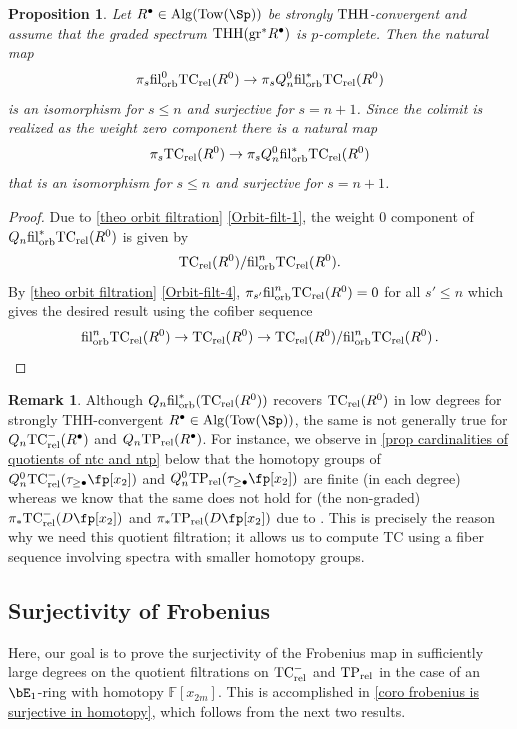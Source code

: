 \documentclass[english,10pt]{amsart}
\newcommand{\rel}{\textup{rel}}
\newcommand{\field}{\mathbb{F}}
\newtheorem{prop}{Proposition}[section]
\theoremstyle{definition}
\newtheorem{rem}{Remark}[section]
\numberwithin{equation}{section}
\DeclareMathOperator{\thh}{\ensuremath{\textup{THH}}}
\newcommand{\THH}{\thh}
\newcommand{\rntc}{\mathrm{TC}_{\rel}^{-}}
\newcommand{\rtp}{\mathrm{TP}_{\rel}}
\newcommand{\rtc}{\mathrm{TC}_{\rel}}
\newcommand{\filorb}{\mathrm{fil}^{*}_{\textup{orb}}}
\newcommand{\filorbo}{\ensuremath{\textup{fil}}^0_{\textup{orb}}}
\newcommand{\filorbn}{\ensuremath{\textup{fil}}^n_{\textup{orb}}}
\newcommand{\Tow}{\mathrm{Tow}}
\newcommand{\Alg}{\mathrm{Alg}}
\newcommand{\pis}{\pi_*}
\newcommand{\gr}{\textup{gr}^*}
\begin{document}
\begin{prop}\label{prop partial filtration aprroximate tc}
Let $R^{\bullet}\in \Alg(\Tow(\Sp))$ be strongly $\THH$-convergent and assume that the graded spectrum $\thh(\gr R^{\bullet})$ is $p$-complete. Then the natural map 
\[\pi_s \filorbo\rtc(R^{0}) \to \pi_s Q_n^0 \filorb \rtc(R^0)
\]
is an isomorphism for $s\leq n$ and surjective for $s=n+1$. Since the colimit is realized as the weight zero component there is a natural map
\[\pi_s \rtc(R^0) \to \pi_s Q_n^0 \filorb \rtc(R^0)
\]
that is an isomorphism for $s\leq n$ and surjective for $s=n+1$.
\end{prop}
\begin{proof}
Due to  \autoref{theo orbit filtration} \eqref{Orbit-filt-1}, the weight $0$ component of $Q_n\filorb \rtc(R^0)$ is given by 
\[\rtc(R^0)/\filorbn\rtc(R^0).\]
By \autoref{theo orbit filtration} \eqref{Orbit-filt-4}, $\pi_{s'} \filorbn\rtc(R^0) = 0$ for all $s'\leq n$ which gives the desired result using the cofiber sequence
\[\filorbn\rtc(R^0) \to \rtc(R^0) \to \rtc(R^0)/\filorbn\rtc(R^0)\,.\] 
\end{proof}

\begin{rem}
Although $Q_n \filorb(\rtc(R^0))$ recovers $\rtc(R^0)$ in low degrees for strongly THH-convergent $R^{\bullet}\in \Alg(\mathrm{Tow}(\Sp))$, the same is not generally true for $Q_n \rntc(R^{\bullet})$ and $Q_n \rtp (R^{\bullet})$. For instance,  we observe in \autoref{prop cardinalities of quotients of ntc and ntp} below that the homotopy groups of $Q_n^0 \rntc(\tau_{\geq \bullet} \fp[x_2])$ and  $Q_n^0 \rtp (\tau_{\geq \bullet} \fp[x_2])$ are finite (in each degree) whereas we know that the same does not hold for (the non-graded) $\pis \rntc (D\fp[x_2])$ and $\pis \rtp(D\fp[x_2])$ due to \cite[Proposition 6.3]{bayindir2020kthryofthh}. This is precisely the reason why we need this quotient filtration; it allows us to compute TC using a fiber sequence involving spectra with smaller homotopy groups. 
\end{rem}

\subsection{Surjectivity of Frobenius}

Here, our goal is to prove the surjectivity of the Frobenius map in sufficiently large degrees on the quotient filtrations on $\rntc$ and $\rtp$ in the case of an $\bE_1$-ring with homotopy $\field[x_{2m}]$. This is accomplished in \autoref{coro frobenius is surjective in homotopy}, which follows from the next two results. 
\end{document}
